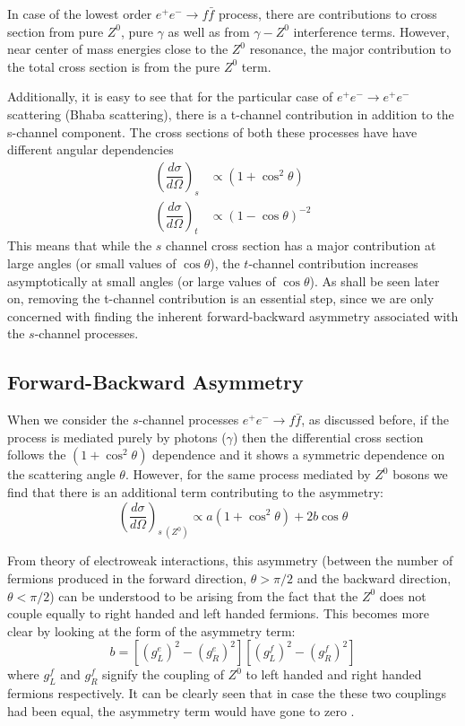 In case of the lowest order $e^{+}e^{-}\rightarrow f \bar{f}$ process, there are contributions to cross section from pure $Z^{0}$, pure $\gamma$ as well as from $\gamma - Z^{0}$ interference terms. However, near center of mass energies close to the $Z^{0}$ resonance, the major contribution to the total cross section is from the pure $Z^{0}$ term.

Additionally, it is easy to see that for the particular case of $e^{+}e^{-}\rightarrow e^{+}e^{-}$ scattering (Bhaba scattering), there is a t-channel contribution in addition to the s-channel component. The cross sections of both these processes have have different angular dependencies \cite{UB}
\begin{align}
\left(\dfrac{d\sigma}{d\Omega}\right)_{s}&\propto (1+\cos^{2}\theta)\\
\left(\dfrac{d\sigma}{d\Omega}\right)_{t}&\propto (1-\cos\theta)^{-2}
\end{align}
This means that while the $s$ channel cross section has a major contribution at large angles (or small values of $\cos\theta$), the $t$-channel contribution increases asymptotically at small angles (or large values of $\cos\theta$). As shall be seen later on, removing the t-channel contribution is an essential step, since we are only concerned with finding the inherent forward-backward asymmetry associated with the $s$-channel processes.

\subsection{Forward-Backward Asymmetry}
When we consider the $s$-channel processes $e^{+}e^{-}\rightarrow f\bar{f}$, as discussed before, if the process is mediated purely by photons ($\gamma$) then the differential cross section follows the $(1+\cos^{2}\theta)$ dependence and it shows a symmetric dependence on the scattering angle $\theta$. However, for the same process mediated by $Z^{0}$ bosons we find that there is an additional term contributing to the asymmetry:
\begin{equation}
\left(\dfrac{d\sigma}{d\Omega}\right)_{s\ (Z^{0})}\propto a(1+\cos^{2}\theta) + 2b\cos\theta
\end{equation}

From theory of electroweak interactions, this asymmetry (between the number of fermions produced in the forward direction, $\theta>\pi /2$ and the backward direction, $\theta<\pi /2$) can be understood to be arising from the fact that the $Z^{0}$ does not couple equally to right handed and left handed fermions. This becomes more clear by looking at the form of the asymmetry term:
\begin{equation}
b=\left[\left(g_{L}^{e}\right)^{2}-\left(g_{R}^{e}\right)^{2}\right]\left[\left(g_{L}^{f}\right)^{2}-\left(g_{R}^{f}\right)^{2}\right]
\end{equation}
where $g_{L}^{f}$ and $g_{R}^{f}$ signify the coupling of $Z^{0}$ to left handed and right handed fermions respectively. It can be clearly seen that in case the these two couplings had been equal, the asymmetry term would have gone to zero \cite{thomson_2013}.

